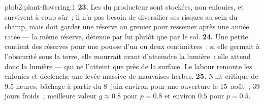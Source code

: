 \begin{solution}{pb:b2:plant-flowering:1}
\textbf{23.} Les  du producteur sont stockées, non enfouies, et
survivent à coup sûr~; il n'a pas besoin de diversifier ses risques au
sein du champ, mais doit garder une réserve au grenier pour ressemer
après une année ratée --- la même réserve, détenue par lui plutôt que
par le sol.
\textbf{24.} Une petite  contient des réserves pour une pousse d'un
ou deux centimètres~; si elle germait à l'obscurité sous la terre, elle
mourrait avant d'atteindre la lumière~: elle attend donc la lumière ---
qui ne l'atteint que près de la surface. Le labour remonte les 
enfouies et déclenche une levée massive de mauvaises herbes.
\textbf{25.} Nuit critique de 9.5 heures, bâchage à partir du 8~juin
environ pour une ouverture le 15~août~; 39 jours froids~; meilleure
valeur $g \approx 0.8$ pour $p = 0.8$ et environ $0.5$ pour $p = 0.5$.
\end{solution}
